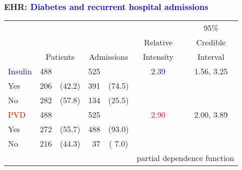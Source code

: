 \documentclass[11pt,pdftex,dvipsnames,usenames,helvetica]{beamer}
\begin{document}
\begin{frame}\frametitle{EHR: \textcolor{blue}{Diabetes and recurrent hospital admissions}}
\begin{center}
\begin{tabular}{lrcrccc}\hline
&                           & & &                              & &95\% \\
&\multicolumn{2}{c}{ }& &                              &Relative&Credible  \\
&\multicolumn{2}{c}{Patients}&\multicolumn{2}{c}{Admissions}&Intensity&Interval\\ \hline
\textcolor{blue}{Insulin}             &488&                       &525&            &\textcolor{blue}{2.39} & 1.56, 3.25\\
  Yes               &206& (42.2)                &391& (74.5)\\
  No                &282& (57.8)                &134& (25.5)\\ \hline
\textcolor{red}{PVD}                 &488&                       &525&            &\textcolor{red}{2.90} &2.00, 3.89\\
  Yes               &272& (55.7)                &488& (93.0)\\
  No                &216& (44.3)                & 37& ( 7.0)\\ \hline
&                           & & &                              &\multicolumn{2}{c}{partial dependence function} \\
\end{tabular}
\end{center}
\end{frame}
\end{document}

